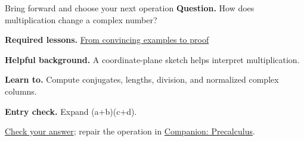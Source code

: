 \begin{learningcard}{Bring forward and choose your next operation}
\textsf{\textbf{Question.}} How does multiplication change a complex number?\par
\textbf{Required lessons.} \hyperref[learn:proof]{From convincing examples to proof}\par
\textbf{Helpful background.} A coordinate-plane sketch helps interpret multiplication.\par
\textbf{Learn to.} Compute conjugates, lengths, division, and normalized complex columns.\par
\textbf{Entry check.} Expand (a+b)(c+d).\par
\hyperref[solution:entry:complex_numbers]{Check your answer}; repair the operation in \href{https://github.com/Oichkatzelesfrettschen/precalc_paper}{Companion: Precalculus}.
\end{learningcard}

